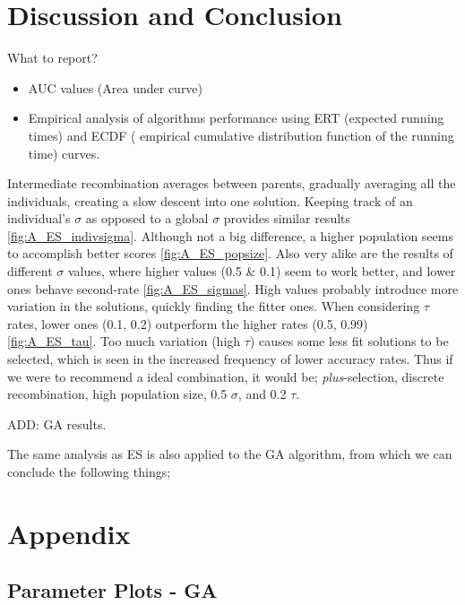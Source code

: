 \documentclass{article}
\begin{document}
\section{Discussion and Conclusion}
\label{sec:disres}

What to report? 
\begin{itemize}
    \item AUC values (Area under curve) 
    \item Empirical analysis of algorithms performance using ERT (expected running times) and ECDF ( empirical cumulative distribution function of the running time) curves. 
\end{itemize}

Intermediate recombination averages between parents, gradually averaging all the individuals, creating a slow descent into one solution.  
Keeping track of an individual's $\sigma$ as opposed to a global $\sigma$ provides similar results \ref{fig:A_ES_indivsigma}.
Although not a big difference, a higher population seems to accomplish better scores \ref{fig:A_ES_popsize}. 
Also very alike are the results of different $\sigma$ values, where higher values (0.5 \& 0.1) seem to work better, and lower ones behave second-rate \ref{fig:A_ES_sigmas}. 
High values probably introduce more variation in the solutions, quickly finding the fitter ones.
When considering $\tau$ rates, lower ones (0.1, 0.2) outperform the higher rates (0.5, 0.99) \ref{fig:A_ES_tau}.
Too much variation (high $\tau$) causes some less fit solutions to be selected, which is seen in the increased frequency of lower accuracy rates.
Thus if we were to recommend a ideal combination, it would be; \textit{plus}-selection, discrete recombination, high population size, 0.5 $\sigma$, and 0.2 $\tau$. 

ADD: GA results. 

The same analysis as ES is also applied to the GA algorithm, from which we can conclude the following things;

  
  


\newpage

\appendix
\section{Appendix}
\label{sec:app}


\subsection{Parameter Plots - GA}
\label{app:params_ga}
\end{document}
